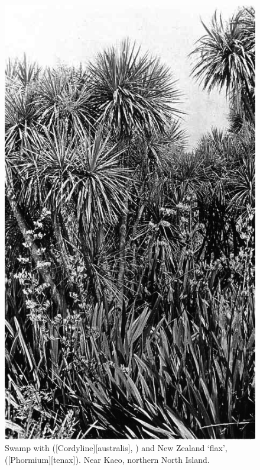 \begin{figure}[t]
	\begin{minipage}[t]{\textwidth}
		\begin{minipage}[t]{(\textwidth-\fgap) * \real{0.395}}
			\centering
			\includegraphics[width=\textwidth]{graphics/figure66cabbagetree.jpg}
			\caption[Swamp with cabbage trees]{Swamp with  ([Cordyline][australis], ) and New Zealand `flax',  ([Phormium][tenax]). Near Kaeo, northern North Island.
}
\end{minipage}
\end{minipage}
\end{figure}
